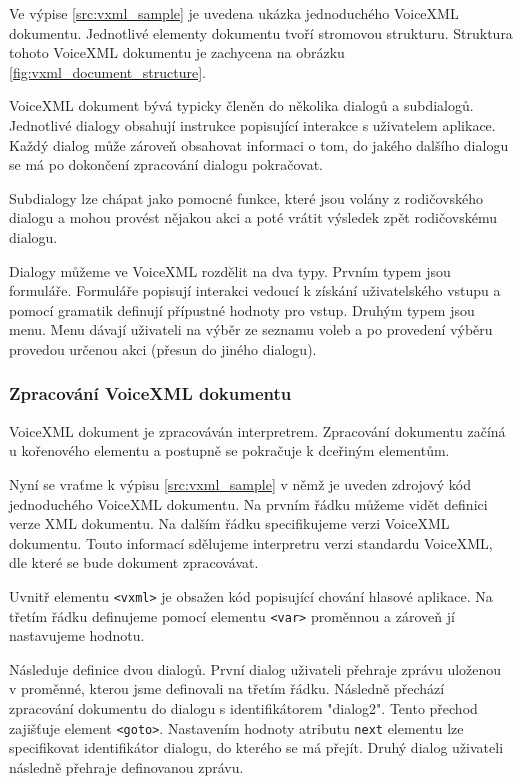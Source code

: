 \documentclass[ing,male,java,dept460]{diploma}						%
\begin{document}
Ve výpise \ref{src:vxml_sample} je uvedena ukázka jednoduchého VoiceXML dokumentu. Jednotlivé elementy dokumentu tvoří stromovou strukturu. Struktura tohoto VoiceXML dokumentu je zachycena na obrázku \ref{fig:vxml_document_structure}.

VoiceXML dokument bývá typicky členěn do několika dialogů a subdialogů. Jednotlivé dialogy obsahují instrukce popisující interakce s uživatelem aplikace. Každý dialog může zároveň obsahovat informaci o tom, do jakého dalšího dialogu se má po dokončení zpracování dialogu pokračovat.

Subdialogy lze chápat jako pomocné funkce, které jsou volány z rodičovského dialogu a mohou provést nějakou akci a poté vrátit výsledek zpět rodičovskému dialogu.

Dialogy můžeme ve VoiceXML rozdělit na dva typy. Prvním typem jsou formuláře. Formuláře popisují interakci vedoucí k získání uživatelského vstupu a pomocí gramatik definují přípustné hodnoty pro vstup. Druhým typem jsou menu. Menu dávají uživateli na výběr ze seznamu voleb a po provedení výběru provedou určenou akci (přesun do jiného dialogu).



\subsubsection{Zpracování VoiceXML dokumentu}
\label{sec:Zpracovani_vxml_dokumentu}
VoiceXML dokument je zpracováván interpretrem. Zpracování dokumentu začíná u kořenového elementu a postupně se pokračuje k dceřiným elementům.

Nyní se vraťme k výpisu \ref{src:vxml_sample} v němž je uveden zdrojový kód jednoduchého VoiceXML dokumentu. Na prvním řádku můžeme vidět definici verze XML dokumentu. Na dalším řádku specifikujeme verzi VoiceXML dokumentu. Touto informací sdělujeme interpretru verzi standardu VoiceXML, dle které se bude dokument zpracovávat.

Uvnitř elementu \texttt{<vxml>} je obsažen kód popisující chování hlasové aplikace. Na třetím řádku definujeme pomocí elementu \texttt{<var>} proměnnou a zároveň jí nastavujeme hodnotu.

Následuje definice dvou dialogů. První dialog uživateli přehraje zprávu uloženou v proměnné, kterou jsme definovali na třetím řádku. Následně přechází zpracování dokumentu do dialogu s identifikátorem "dialog2". Tento přechod zajišťuje element \texttt{<goto>}. Nastavením hodnoty atributu \texttt{next} elementu lze specifikovat identifikátor dialogu, do kterého se má přejít. Druhý dialog uživateli následně přehraje definovanou zprávu.
\end{document}

